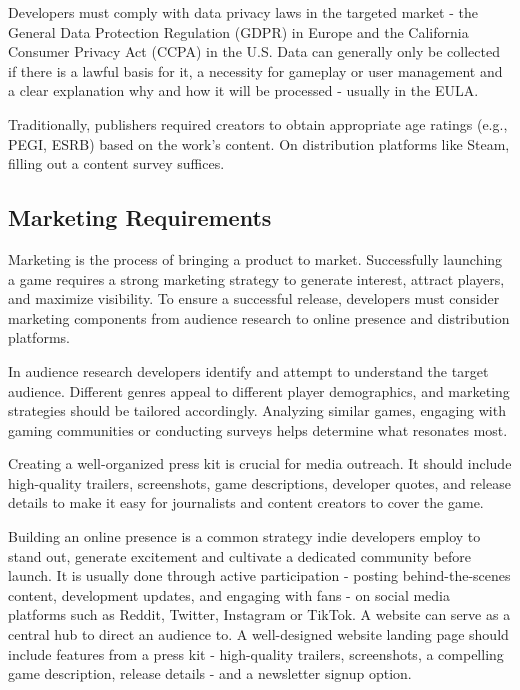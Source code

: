 Developers must comply with data privacy laws in the targeted market - the General Data Protection Regulation (GDPR) in Europe and the California Consumer Privacy Act (CCPA) in the U.S. Data can generally only be collected if there is a lawful basis for it, a necessity for gameplay or user management and a clear explanation why and how it will be processed - usually in the EULA.

Traditionally, publishers required creators to obtain appropriate age ratings (e.g., PEGI, ESRB) based on the work’s content. On distribution platforms like Steam, filling out a content survey suffices.

\subsection{Marketing Requirements}
Marketing is the process of bringing a product to market. Successfully launching a game requires a strong marketing strategy to generate interest, attract players, and maximize visibility. To ensure a successful release, developers must consider marketing components from audience research to online presence and distribution platforms.

In audience research developers identify and attempt to understand the target audience. Different genres appeal to different player demographics, and marketing strategies should be tailored accordingly. Analyzing similar games, engaging with gaming communities or conducting surveys helps determine what resonates most.

Creating a well-organized press kit is crucial for media outreach. It should include high-quality trailers, screenshots, game descriptions, developer quotes, and release details to make it easy for journalists and content creators to cover the game.

Building an online presence is a common strategy indie developers employ to stand out, generate excitement and cultivate a dedicated community before launch. It is usually done through active participation - posting behind-the-scenes content, development updates, and engaging with fans - on social media platforms such as Reddit, Twitter, Instagram or TikTok. A website can serve as a central hub to direct an audience to. A well-designed website landing page should include features from a press kit - high-quality trailers, screenshots, a compelling game description, release details - and a newsletter signup option.

